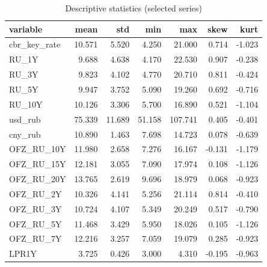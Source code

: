 \begin{table}
\caption{Descriptive statistics (selected series)}
\label{tab:5_1}
\begin{tabular}{lrrrrrr}
\toprule
variable & mean & std & min & max & skew & kurt \\
\midrule
cbr_key_rate & 10.571 & 5.520 & 4.250 & 21.000 & 0.714 & -1.023 \\
RU_1Y & 9.688 & 4.638 & 4.170 & 22.530 & 0.907 & -0.238 \\
RU_3Y & 9.823 & 4.102 & 4.770 & 20.710 & 0.811 & -0.424 \\
RU_5Y & 9.947 & 3.752 & 5.090 & 19.260 & 0.692 & -0.716 \\
RU_10Y & 10.126 & 3.306 & 5.700 & 16.890 & 0.521 & -1.104 \\
usd_rub & 75.339 & 11.689 & 51.158 & 107.741 & 0.405 & -0.401 \\
cny_rub & 10.890 & 1.463 & 7.698 & 14.723 & 0.078 & -0.639 \\
OFZ_RU_10Y & 11.980 & 2.658 & 7.276 & 16.167 & -0.131 & -1.179 \\
OFZ_RU_15Y & 12.181 & 3.055 & 7.090 & 17.974 & 0.108 & -1.126 \\
OFZ_RU_20Y & 13.765 & 2.619 & 9.696 & 18.979 & 0.068 & -0.923 \\
OFZ_RU_2Y & 10.326 & 4.141 & 5.256 & 21.114 & 0.814 & -0.410 \\
OFZ_RU_3Y & 10.724 & 4.107 & 5.349 & 20.249 & 0.517 & -0.790 \\
OFZ_RU_5Y & 11.468 & 3.429 & 5.950 & 18.026 & 0.105 & -1.126 \\
OFZ_RU_7Y & 12.216 & 3.257 & 7.059 & 19.079 & 0.285 & -0.923 \\
LPR1Y & 3.725 & 0.426 & 3.000 & 4.310 & -0.195 & -0.963 \\
\bottomrule
\end{tabular}
\end{table}
